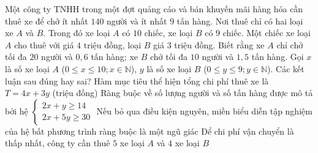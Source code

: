 \begin{ex}%
    Một công ty TNHH trong một đợt quảng cáo và bán khuyến mãi hàng hóa cần thuê xe để chở ít nhất $140$ người và ít nhất $9$ tấn hàng. Nơi thuê chỉ có hai loại xe $A$ và $B$. Trong đó xe loại $A$ có $10$ chiếc, xe loại $B$ có $9$ chiếc. Một chiếc xe loại $A$ cho thuê với giá $4$ triệu đồng, loại $B$ giá $3$ triệu đồng. Biết rằng xe $A$ chỉ chở tối đa $20$ người và $0{,}6$ tấn hàng; xe $B$ chở tối đa $10$ người và $1{,}5$ tấn hàng. Gọi $x$ là số xe loại $A$ ($0 \le x \le 10; x \in \mathbb{N}$), $y$ là số xe loại $B$ ($0 \le y \le 9; y \in \mathbb{N}$). Các kết luận sau đúng hay sai?
    \choiceTF
    {\True Hàm mục tiêu thể hiện tổng chi phí thuê xe là $T = 4x + 3y$ (triệu đồng)}
    {\True Ràng buộc về số lượng người và số tấn hàng được mô tả bởi hệ $\begin{cases} 2x + y \ge 14 \\ 2x + 5y \ge 30 \end{cases}$}
    { Nếu bỏ qua điều kiện nguyên, miền biểu diễn tập nghiệm của hệ bất phương trình ràng buộc là một ngũ giác}
    {\True Để chi phí vận chuyển là thấp nhất, công ty cần thuê $5$ xe loại $A$ và $4$ xe loại $B$}
\end{ex}

